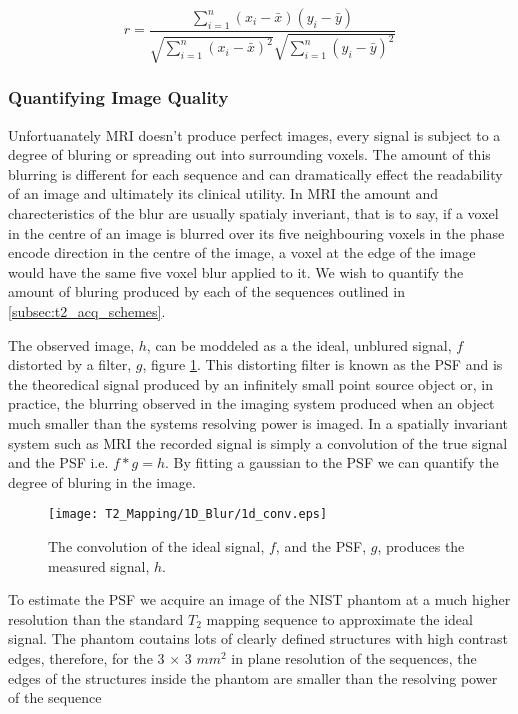 \begin{equation}
\label{eq:pearson_cc}
r = \frac{\sum^{n}_{i=1}\left(x_i - \bar{x}\right )\left(y_i - \bar{y}\right )}{\sqrt{\sum^{n}_{i=1}\left(x_i - \bar{x}\right )^2}\sqrt{\sum^{n}_{i=1}\left(y_i - \bar{y}\right )^2}}
\end{equation}

\subsubsection{Quantifying Image Quality}
Unfortuanately \ac{MRI} doesn't produce perfect images, every signal is subject to a degree of bluring or spreading out into surrounding voxels. The amount of this blurring is different for each sequence and can dramatically effect the readability of an image and ultimately its clinical utility. In \ac{MRI} the amount and charecteristics of the blur are usually spatialy inveriant, that is to say, if a voxel in the centre of an image is blurred over its five neighbouring voxels in the phase encode direction in the centre of the image, a voxel at the edge of the image would have the same five voxel blur applied to it. We wish to quantify the amount of bluring produced by each of the sequences outlined in \ref{subsec:t2_acq_schemes}.

The observed image, $h$, can be moddeled as a the ideal, unblured signal, $f$ distorted by a filter, $g$, figure \ref{fig:t2_1d_blur}. This distorting filter is known as the \ac{PSF} and is the theoredical signal produced by an infinitely small point source object or, in practice, the blurring observed in the imaging system produced when an object much smaller than the systems resolving power is imaged. In a spatially invariant system such as \ac{MRI} the recorded signal is simply a convolution of the true signal and the \ac{PSF} i.e. $f \ast g = h$. By fitting a gaussian to the \ac{PSF} we can quantify the degree of bluring in the image. 
\begin{figure}[H]
	\centering
	\texttt{[image: T2\_Mapping/1D\_Blur/1d\_conv.eps]}
	\caption{The convolution of the ideal signal, $f$, and the \ac{PSF}, $g$, produces the measured signal, $h$.}
	\label{fig:t2_1d_blur}	
\end{figure}

To estimate the \ac{PSF} we acquire an image of the \ac{NIST} phantom at a much higher resolution than the standard $T_2$ mapping sequence to approximate the ideal signal. The phantom coutains lots of clearly defined structures with high contrast edges, therefore, for the 3 $\times$ 3 $mm^2$ in plane resolution of the sequences, the edges of the structures inside the phantom are smaller than the resolving power of the sequence

